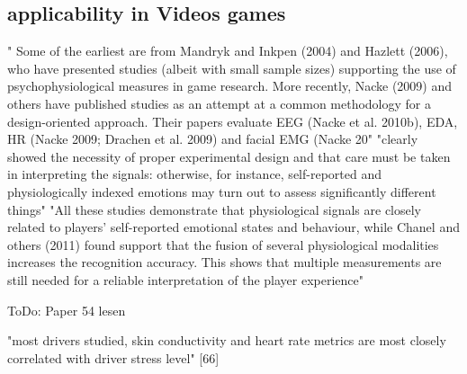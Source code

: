 \subsection{applicability in Videos games}
" Some of the earliest are from Mandryk and
Inkpen (2004) and Hazlett (2006), who have presented studies (albeit with
small sample sizes) supporting the use of psychophysiological measures in
game research. More recently, Nacke (2009) and others have published studies as an attempt at a common methodology for a design-oriented approach.
Their papers evaluate EEG (Nacke et al. 2010b), EDA, HR (Nacke 2009;
Drachen et al. 2009) and facial EMG (Nacke 20" \cite{kivikangas2011review}
"clearly showed the necessity of proper
experimental design and that care must be taken in interpreting the signals:
otherwise, for instance, self-reported and physiologically indexed emotions
may turn out to assess significantly different things"  \cite{kivikangas2011review}
"All these
studies demonstrate that physiological signals are closely related to players’
self-reported emotional states and behaviour, while Chanel and others (2011)
found support that the fusion of several physiological modalities increases the
recognition accuracy. This shows that multiple measurements are still needed
for a reliable interpretation of the player experience"  \cite{kivikangas2011review}





ToDo: Paper 54 lesen

"most drivers studied, skin conductivity and heart rate metrics are most closely correlated with driver stress level" [66]


